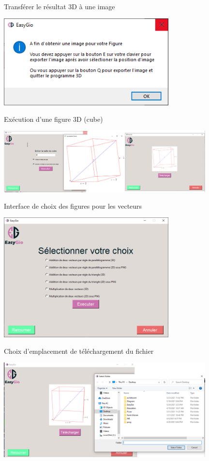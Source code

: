 \documentclass{beamer}
\begin{document}
\begin{frame}{Transférer le résultat 3D à une image}
\begin{center}
    \includegraphics[width=9cm]{pic/3DToImage.PNG}
\end{center}
\end{frame}
\begin{frame}{Exécution d'une figure 3D (cube)}
\begin{center}
    \includegraphics[width=11cm]{pic/CubeT.PNG}
\end{center}
\end{frame}
\begin{frame}{Interface de choix des figures pour les vecteurs}
\begin{center}
    \includegraphics[width=9cm]{pic/Vecteur.PNG}
\end{center}
\end{frame}
\begin{frame}{Choix d'emplacement de téléchargement du fichier}
\begin{center}
    \includegraphics[width=11cm]{pic/CubeP.PNG}
\end{center}
\end{frame}
\end{document}
